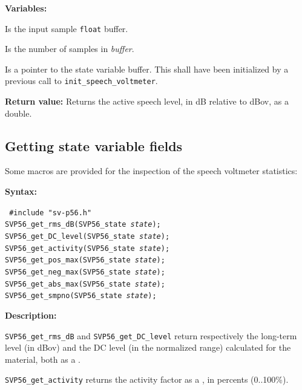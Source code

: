 {\bf Variables: }
\begin{Descr}{\DescrLen}
\item[\pbox{20mm}{\em buffer}] %
               Is the input sample {\tt float} buffer.

\item[\pbox{20mm}{\em smpno}] %
               Is the number of samples in {\em buffer}.

\item[\pbox{20mm}{\em state}] %
               Is a pointer to the state variable buffer. This 
               shall have been initialized by a previous call to 
               {\tt init\_speech\_voltmeter}.
\end{Descr}
        
{\bf Return value: }      
    Returns the active speech level, in dB relative to dBov, as a double.


\subsection{Getting state variable fields} \label{using-P56-fields}

Some macros are provided for the inspection of the speech voltmeter statistics:

{\bf Syntax: }

{\tt 
\#include "sv-p56.h"\\
SVP56\_get\_rms\_dB(SVP56\_state {\em state});\\
SVP56\_get\_DC\_level(SVP56\_state {\em state});\\
SVP56\_get\_activity(SVP56\_state {\em state});\\
SVP56\_get\_pos\_max(SVP56\_state {\em state});\\
SVP56\_get\_neg\_max(SVP56\_state {\em state});\\
SVP56\_get\_abs\_max(SVP56\_state {\em state});\\
SVP56\_get\_smpno(SVP56\_state {\em state});
}

{\bf Description: }

{\tt SVP56\_get\_rms\_dB} and {\tt SVP56\_get\_DC\_level}
return respectively the long-term level (in dBov) and the DC level (in
the normalized range) calculated for the material, both as a \double.

{\tt SVP56\_get\_activity} returns the activity factor as a \double, 
in percents (0..100\%).

